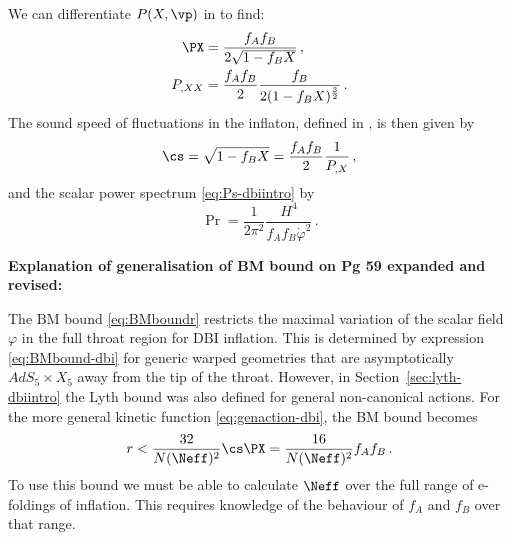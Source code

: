 % 
% 

We can differentiate $P(X, \vp)$ in  to find:
% 
\begin{align}
 \PX &= \frac{f_A f_B}{2\sqrt{1-f_B X}} \,, \\
 P_{,XX} &= \frac{f_A f_B}{2}\frac{f_B}{2(1-f_B X)^{\frac{3}{2}}} \,.
\end{align}
% 
% 
The sound speed of fluctuations in 
the inflaton, defined in , is then given by
%  
\begin{equation}
\label{eq:cs-dbi}
\cs = \sqrt{1-f_B X} = \frac{f_Af_B}{2} \frac{1}{P_{,X}}  \,,
\end{equation}
% 
and the scalar power spectrum \eqref{eq:Ps-dbiintro} by
% 
\begin{equation}
\label{eq:spectrum-dbi}
\Pr = \frac{1}{2\pi^2}\frac{H^4}{f_Af_B\dot{\varphi}^2}  \,.
\end{equation}

\textbf{Explanation of generalisation of BM bound on Pg 59 expanded and revised:}

The BM bound \eqref{eq:BMboundr} restricts the maximal 
variation of the scalar field $\varphi$ in the full throat region for DBI inflation. 
This is determined by expression \eqref{eq:BMbound-dbi} 
for generic warped geometries that are asymptotically 
$AdS_5 \times X_5$ away from the tip of the throat. However, in Section~\ref{sec:lyth-dbiintro} the
Lyth bound was also defined for general
non-canonical actions. For the more general kinetic function
\eqref{eq:genaction-dbi}, the BM bound becomes
% 
\begin{equation}
\label{eq:bmboundgen-dbi}
 r < \frac{32}{N(\Neff)^2}\cs\PX = \frac{16}{N(\Neff)^2}f_A f_B \,.
\end{equation}
% 
To use this bound we must be able to calculate $\Neff$ over the full range of e-foldings of
inflation. This requires knowledge of the behaviour of $f_A$ and $f_B$ over that range. 

